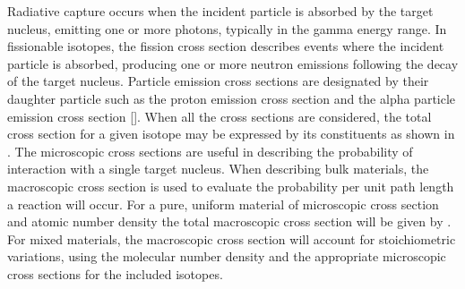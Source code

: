 \documentclass[../../../../main.tex]{subfiles}
\begin{document}
    Radiative capture \Xvariable{\sigma_{\gamma}} occurs when the incident particle is absorbed by the target nucleus, emitting one or more photons, typically in the gamma energy range.
    In fissionable isotopes, the fission cross section  describes events where the incident particle is absorbed, producing one or more neutron emissions following the decay of the target nucleus.
    Particle emission cross sections are designated by their daughter particle such as the proton emission cross section  and the alpha particle emission cross section \Xvariable{\sigma_{\alpha}}[].
    When all the cross sections are considered, the total cross section for a given isotope may be expressed by its constituents as shown in .
    The microscopic cross sections \Xvariable{\sigma} are useful in describing the probability of interaction with a single target nucleus.
    When describing bulk materials, the macroscopic cross section \Xvariable{\Sigma} is used to evaluate the probability per unit path length a reaction will occur.
    For a pure, uniform material of microscopic cross section  and atomic number density  the total macroscopic cross section  will be given by .
    For mixed materials, the macroscopic cross section will account for stoichiometric variations, using the molecular number density and the appropriate microscopic cross sections for the included isotopes.
\end{document}
